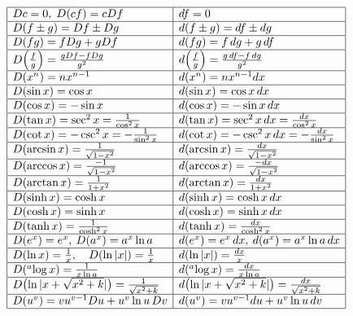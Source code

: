 \documentclass[a5paper]{article}
\begin{document}
\[
\begin{array}{|l|l|}
\hline
Dc = 0, \; D(c f) = c Df & df = 0 \\
\hline
D(f \pm g) = Df \pm Dg & d(f \pm g) = df \pm dg \\
\hline
D(fg) = f Dg + g Df & d(fg) = f\,dg + g\,df \\
\hline
D\!\left(\frac{f}{g}\right) = \frac{gDf - fDg}{g^2} & d\!\left(\frac{f}{g}\right) = \frac{g\,df - f\,dg}{g^2} \\
\hline
D(x^n) = n x^{n-1} & d(x^n) = n x^{n-1} dx \\
\hline
D(\sin x) = \cos x & d(\sin x) = \cos x\,dx \\
\hline
D(\cos x) = -\sin x & d(\cos x) = -\sin x\,dx \\
\hline
D(\tan x) = \sec^2 x = \frac{1}{\cos^2 x} & d(\tan x) = \sec^2 x\,dx = \frac{dx}{\cos^2 x} \\
\hline
D(\cot x) = -\csc^2 x = -\frac{1}{\sin^2 x} & d(\cot x) = -\csc^2 x\,dx = -\frac{dx}{\sin^2 x} \\
\hline
D(\arcsin x) = \frac{1}{\sqrt{1-x^2}} & d(\arcsin x) = \frac{dx}{\sqrt{1-x^2}} \\
\hline
D(\arccos x) = \frac{-1}{\sqrt{1-x^2}} & d(\arccos x) = \frac{-dx}{\sqrt{1-x^2}} \\
\hline
D(\arctan x) = \frac{1}{1+x^2} & d(\arctan x) = \frac{dx}{1+x^2} \\
\hline
D(\sinh x) = \cosh x & d(\sinh x) = \cosh x\,dx \\
\hline
D(\cosh x) = \sinh x & d(\cosh x) = \sinh x\,dx \\
\hline
D(\tanh x) = \frac{1}{\cosh^2 x} & d(\tanh x) = \frac{dx}{\cosh^2 x} \\
\hline
D(e^x)=e^x,\:D(a^x)=a^x \ln a & d(e^x)=e^x\,dx,\:d(a^x)=a^x \ln a\,dx \\
\hline
D(\ln x) = \frac{1}{x}, \quad D(\ln|x|) = \frac{1}{x} & d(\ln|x|) = \frac{dx}{x} \\
\hline
D({}^a\!\log x) = \frac{1}{x \ln a} & d({}^a\!\log x) = \frac{dx}{x \ln a} \\
\hline
D\!\left(\ln|x + \sqrt{x^2 + k}|\right) = \frac{1}{\sqrt{x^2 + k}} &
d\!\left(\ln|x + \sqrt{x^2 + k}|\right) = \frac{dx}{\sqrt{x^2 + k}} \\
\hline
D(u^v) = v u^{v-1} Du + u^v \ln u\, Dv &
d(u^v) = v u^{v-1} du + u^v \ln u\, dv \\
\hline
\end{array}
\]
\normalsize

\newpage
\end{document}
